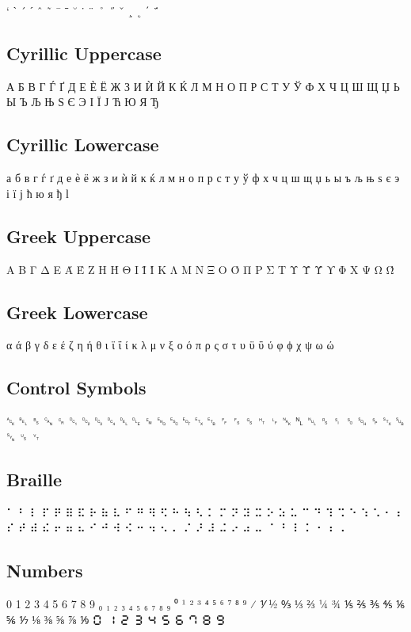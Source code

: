 ` ˋ ´ ˊ ˆ ˜ ¯ ˉ ˘ ˙ ¨ ˚ ˝ ˇ ¸ ˛ ΄ ΅

\subsection{Cyrillic Uppercase}

А Б В Г Ѓ Ґ Д Е Ѐ Ё Ж З И Ѝ Й К Ќ Л М Н О П Р С Т У Ў Ф Х Ч Ц Ш Щ Џ Ь Ы Ъ Љ Њ Ѕ Є Э І Ї Ј Ћ Ю Я Ђ

\subsection{Cyrillic Lowercase}

а б в г ѓ ґ д е ѐ ё ж з и ѝ й к ќ л м н о п р с т у ў ф х ч ц ш щ џ ь ы ъ љ њ ѕ є э і ї ј ћ ю я ђ ӏ

\subsection{Greek Uppercase}

Α Β Γ Δ Ε Ά Έ Ζ Η Ή Θ Ι Ϊ Ί Κ Λ Μ Ν Ξ Ο Ό Π Ρ Σ Τ Υ Ϋ Ύ ϒ Φ Χ Ψ Ω Ώ

\subsection{Greek Lowercase}

α ά β γ δ ε έ ζ η ή θ ι ϊ ΐ ί κ λ μ ν ξ ο ό π ρ ς σ τ υ ϋ ΰ ύ φ ϕ χ ψ ω ώ

\subsection{Control Symbols}

␆ ␇ ␈ ␘ ␍ ␑ ␒ ␓ ␔ ␡ ␐ ␙ ␅ ␛ ␄ ␃ ␗ ␌ ␜ ␝ ␉ ␊ ␕ ␤ ␀ ␞ ␏ ␎ ␁ ␠ ␂ ␚ ␖ ␟ ␋

\subsection{Braille}

⠁ ⠃ ⠇ ⠏ ⠟ ⠿ ⠯ ⠗ ⠷ ⠧ ⠋ ⠛ ⠻ ⠫ ⠓ ⠳ ⠣ ⠅ ⠍ ⠝ ⠽ ⠭ ⠕ ⠵ ⠥ ⠉ ⠙ ⠹ ⠩ ⠑ ⠱ ⠡ ⠂ ⠆ ⠎ ⠞ ⠾ ⠮ ⠖ ⠶ ⠦ ⠊ ⠚ ⠺ ⠪ ⠒ ⠲ ⠢ ⠄ ⠌ ⠜ ⠼ ⠬ ⠔ ⠴ ⠤ ⠈ ⠘ ⠸ ⠨ ⠐ ⠰ ⠠

\subsection{Numbers}

0 1 2 3 4 5 6 7 8 9 ₀ ₁ ₂ ₃ ₄ ₅ ₆ ₇ ₈ ₉ ⁰ ¹ ² ³ ⁴ ⁵ ⁶ ⁷ ⁸ ⁹ ⁄ ⅟ ½ ↉ ⅓ ⅔ ¼ ¾ ⅕ ⅖ ⅗ ⅘ ⅙ ⅚ ⅐ ⅛ ⅜ ⅝ ⅞ ⅑ 🯰 🯱 🯲 🯳 🯴 🯵 🯶 🯷 🯸 🯹

